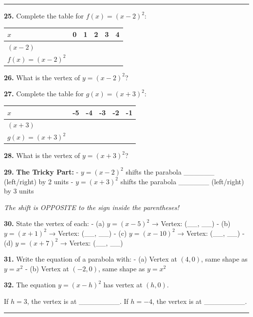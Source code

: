 \documentclass[
  11pt,
]{article}
\begin{document}
\begin{center}\rule{0.5\linewidth}{0.5pt}\end{center}

\textbf{25.} Complete the table for \(f(x) = (x - 2)^2\):

\begin{longtable}[]{@{}llllll@{}}
\toprule\noalign{}
\(x\) & 0 & 1 & 2 & 3 & 4 \\
\midrule\noalign{}
\endhead
\bottomrule\noalign{}
\endlastfoot
\((x-2)\) & & & & & \\
\(f(x) = (x-2)^2\) & & & & & \\
\end{longtable}

\textbf{26.} What is the vertex of \(y = (x - 2)^2\)?

\textbf{27.} Complete the table for \(g(x) = (x + 3)^2\):

\begin{longtable}[]{@{}llllll@{}}
\toprule\noalign{}
\(x\) & -5 & -4 & -3 & -2 & -1 \\
\midrule\noalign{}
\endhead
\bottomrule\noalign{}
\endlastfoot
\((x+3)\) & & & & & \\
\(g(x) = (x+3)^2\) & & & & & \\
\end{longtable}

\textbf{28.} What is the vertex of \(y = (x + 3)^2\)?

\textbf{29.} \textbf{The Tricky Part:} - \(y = (x - 2)^2\) shifts the
parabola \_\_\_\_\_\_ (left/right) by 2 units - \(y = (x + 3)^2\) shifts
the parabola \_\_\_\_\_\_ (left/right) by 3 units

\emph{The shift is OPPOSITE to the sign inside the parentheses!}

\textbf{30.} State the vertex of each: - (a) \(y = (x - 5)^2\) → Vertex:
(\_\_, \_\_) - (b) \(y = (x + 1)^2\) → Vertex: (\_\_, \_\_) - (c)
\(y = (x - 10)^2\) → Vertex: (\_\_, \_\_) - (d) \(y = (x + 7)^2\) →
Vertex: (\_\_, \_\_)

\textbf{31.} Write the equation of a parabola with: - (a) Vertex at
\((4, 0)\), same shape as \(y = x^2\) - (b) Vertex at \((-2, 0)\), same
shape as \(y = x^2\)

\textbf{32.} The equation \(y = (x - h)^2\) has vertex at \((h, 0)\).

If \(h = 3\), the vertex is at \_\_\_\_\_\_\_\_. If \(h = -4\), the
vertex is at \_\_\_\_\_\_\_\_.

\begin{center}\rule{0.5\linewidth}{0.5pt}\end{center}
\end{document}
